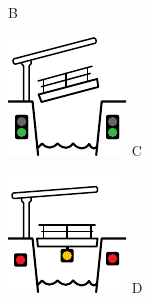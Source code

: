 \begin{figure}[H]
\begin{minipage}[b]{0.23\textwidth}
		\centering
		B
	\end{minipage}
	\hfill
	\begin{minipage}[b]{0.23\textwidth}
		\includegraphics[width=\textwidth]{Hoofdstukken/Bruggen/pdf/brug_toegestaan.pdf}
		\centering
		C
	\end{minipage}
	\hfill
	\begin{minipage}[b]{0.23\textwidth}
		\includegraphics[width=\textwidth]{Hoofdstukken/Bruggen/pdf/brug_doorvaart_toegestaan.pdf}
		\centering
		D
	\end{minipage}
\end{figure}

